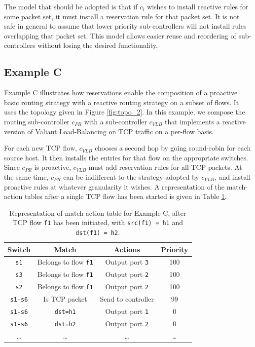 \documentclass{article}
\begin{document}
The model that should be adopted is that if $c_i$ wishes to install 
reactive rules for some packet set, it must install a reservation rule for that
packet set. 
It is not safe in general to assume that lower priority 
sub-controllers will not install rules overlapping that packet set.
This model allows easier reuse and reordering of sub-controllers without
losing the desired functionality.

\subsection{Example C} \label{Ex_C}

Example C illustrates how reservations enable the composition of a 
proactive basic routing strategy with a reactive routing strategy on
a subset of flows. It uses the topology given in Figure \ref{fig:topo_2}.
In this example, we compose the routing sub-controller $c_{PR}$
with a sub-controller $c_{VLB}$ that implements a reactive version of
Valiant Load-Balancing on TCP traffic on a per-flow basis.

For each new TCP flow, $c_{VLB}$ chooses a second hop by going round-robin
for each source host. It then installs the entries for that
flow on the appropriate switches. Since $c_{PR}$ is proactive, 
$c_{VLB}$ must add reservation rules for all TCP packets.
At the same time, $c_{PR}$ can be indifferent to the strategy adopted
by $c_{VLB}$, and install proactive rules at whatever granularity it wishes.
A representation of the match-action tables after a single TCP flow has
been started is given in Table \ref{table_C}.

\begin{table}
\begin{center}
\begin{tabular}{|c|c|c|c|}
\hline
Switch & Match & Actions & Priority \\
\hline
\texttt{s1} & Belongs to flow \texttt{f1} & Output port \texttt{3} & 100 \\
\hline
\texttt{s3} & Belongs to flow \texttt{f1} & Output port \texttt{2} & 100 \\
\hline
\texttt{s2} & Belongs to flow \texttt{f1} & Output port \texttt{2} & 100 \\
\hline
\texttt{s1-s6} & Is TCP packet & Send to controller & 99 \\
\hline
\texttt{s1-s6} & \texttt{dst=h1} & Output port \texttt{1} & 0 \\
\hline
\texttt{s1-s6} & \texttt{dst=h2} & Output port \texttt{2} & 0 \\
\hline
\dots & \dots & \dots & \dots \\
\hline
\end{tabular}
\end{center}
\caption{Representation of match-action table for Example C, after
TCP flow \texttt{f1} has been initiated, with \texttt{src(f1) = h1} and
\texttt{dst(f1) = h2}.}
\label{table_C}
\end{table}
\end{document}
